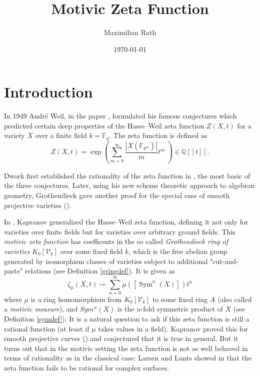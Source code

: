 \documentclass[11pt, a4paper, german]{article}
\author{Maximilian Rath}
\date{\today}
\title{Motivic Zeta Function}
\theoremstyle{plain}
\newtheorem{theorem}{Theorem}[section]
\theoremstyle{definition}
\newcommand{\gring}[1][k]{K_0[\mathcal{V}_#1]}
\DeclareMathOperator{\Sym}{Sym}
\begin{document}
\maketitle
\tableofcontents
\section{Introduction}

In 1949 Andr\'e Weil, in the paper \cite{weil1949}, formulated his famous conjectures
which predicted certain deep properties of the Hasse--Weil zeta function $Z(X,t)$ for a variety $X$ over a finite field $k = \mathbb{F}_q$.
The zeta function is defined as 
\[
    Z(X,t) = \exp \left(\sum_{m=0}^\infty \frac{|X(\mathbb{F}_{q^m})|}{m} t^m \ \right) \in \mathbb{Q}[[t]].
\]

Dwork first established the rationality of the zeta function in \cite{Dwork}, the most basic of the three conjectures. 
Later, using his new scheme theoretic approach to algebraic geometry, Grothendieck gave another proof for the special case of 
smooth projective varieties (\cite{GroRat}).


In \cite{kapranov}, Kapranov generalized the Hasse--Weil zeta function, defining it not only for varieties over finite fields
but for varieties over arbitrary ground fields. 
This \emph{motivic zeta function} has coefficents in the so called \emph{Grothendieck ring of varieties} $\gring[k]$ 
over some fixed field $k$, 
which is the free abelian group generated by isomorphism classes of varieties subject to additional "cut-and-paste" relations
(see Definition \ref{gringdef}). It is given as 
\[
    \zeta_{\mu}(X,t) \coloneqq \sum_{n=0}^{\infty} \mu \left( \left[ \Sym^n(X) \right] \right) t^n
\]
where $\mu$ is a ring homomorphism from $\gring[k]$ to some fixed ring $A$ (also called a \emph{motivic measure}), 
and $Sym^n(X)$ is the $n$-fold symmetric product of $X$ (see Definition \ref{symdef}). 
It is a natural question to ask if this zeta function is still a rational function (at least if $\mu$ takes values in a field).
Kapranov proved this for smooth projective curves (\cite[Thm 1.1.9]{kapranov}) and conjectured that it is true in general.
But it turns out that in the motivic setting the zeta function is not as well behaved in terms of rationality as in the classical case:
Larsen and Lunts showed in \cite{MR1996804} that the zeta function fails to be rational for complex surfaces.
\end{document}
